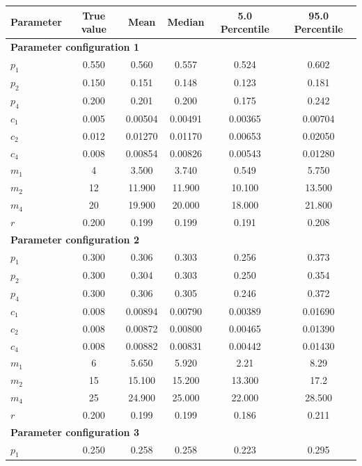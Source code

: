 \documentclass[pdflatex,sn-mathphys-num]{sn-jnl}
\theoremstyle{thmstyleone}%
\theoremstyle{thmstyletwo}%
\theoremstyle{thmstylethree}%
\begin{document}
\begin{table}[h]
    \centering
    \begin{tabular}{lccccc}
        \toprule
         Parameter & True value & Mean & Median  & 5.0 Percentile & 95.0 Percentile \\
         \midrule
        \multicolumn{4}{l}{\textbf{Parameter configuration 1}} \\
         $p_1$ & 0.550 &  0.560 & 0.557 & 0.524 & 0.602 \\
         $p_2$ & 0.150 & 0.151 & 0.148 & 0.123 & 0.181\\
         $p_4$ & 0.200 & 0.201 & 0.200 & 0.175 &     0.242 \\
         $c_1$ & 0.005 & 0.00504 & 0.00491 & 0.00365 & 0.00704\\
        $c_2$ & 0.012 & 0.01270 & 0.01170 & 0.00653 & 0.02050 \\
        $c_4$ & 0.008 & 0.00854 & 0.00826 & 0.00543 & 0.01280\\
        $m_1$ & 4 & 3.500 & 3.740 & 0.549 & 5.750  \\
        $m_2$ & 12 & 11.900 & 11.900 & 10.100 & 13.500  \\
        $m_4$ & 20 & 19.900 & 20.000 & 18.000 & 21.800 \\
        $r$ & 0.200  & 0.199 & 0.199 &  0.191 & 0.208\\
        \multicolumn{4}{l}{\textbf{Parameter configuration 2}} \\
        $p_1$ & 0.300 & 0.306 & 0.303 & 0.256 & 0.373\\
        $p_2$ & 0.300 & 0.304 & 0.303 & 0.250 & 0.354 \\
        $p_4$ & 0.300 & 0.306 & 0.305 & 0.246 & 0.372\\
        $c_1$ & 0.008 & 0.00894 & 0.00790 & 0.00389 & 0.01690\\
        $c_2$ & 0.008 & 0.00872 & 0.00800 & 0.00465 & 0.01390 \\
        $c_4$ & 0.008 & 0.00882 & 0.00831 & 0.00442 & 0.01430\\
        $m_1$ & 6 & 5.650 & 5.920 & 2.21 & 8.29 \\
        $m_2$ & 15 & 15.100 & 15.200 & 13.300 & 17.2 \\
        $m_4$ & 25 & 24.900 & 25.000 & 22.000 & 28.500\\
        $r$ & 0.200 & 0.199 & 0.199 & 0.186 & 0.211\\
        \multicolumn{4}{l}{\textbf{Parameter configuration 3}} \\
        $p_1$ & 0.250 & 0.258 & 0.258 & 0.223 & 0.295\\

\end{tabular}
\end{table}
\end{document}

